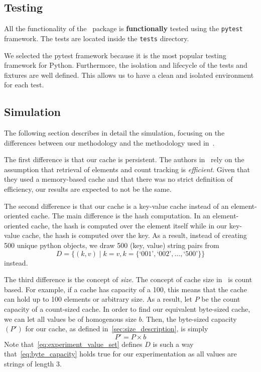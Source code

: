 \subsection{Testing}
All the functionality of the \sqlitecache~package is \textbf{functionally} tested using
the \texttt{pytest} framework. The tests are located inside the \texttt{tests} directory.

We selected the pytest framework because it is the most popular testing framework
for Python. Furthermore, the isolation and lifecycle of the tests and fixtures
are well defined. This allows us to have a clean and isolated environment
for each test.


\subsection{Simulation\label{sec:simulation}}
The following section describes in detail the simulation, focusing on the differences
between our methodology and the methodology used in~\cite{shah2023ImprovedCacheEviction}.

The first difference is that our cache is persistent.
The authors in~\cite{shah2023ImprovedCacheEviction} rely on the assumption
that retrieval of elements and count tracking is \textit{efficient}. Given
that they used a memory-based cache and that there was no strict definition
of efficiency, our results are expected to not be the same.

The second difference is that our cache is a key-value cache instead
of an element-oriented cache. The main difference is the hash computation.
In an element-oriented cache, the hash is computed over the element itself
while in our key-value cache, the hash is computed over the key.
As a result, instead of creating 500 unique python objects,
we draw 500 (key, value) string pairs from
\begin{equation}
D = \{(k, v) \mid k = v, k = \{\text{`001'}, \text{`002'}, \ldots, \text{`500'}\}\}
\label{eq:experiment_value_set}
\end{equation}
instead.

The third difference is the concept of \textit{size}.
The concept of cache size in~\cite{shah2023ImprovedCacheEviction}
is count based. For example, if a cache has capacity of a 100,
this means that the cache can hold up to 100 elements or
arbitrary size. As a result, let $P$ be the count capacity
of a count-sized cache. In order to find our equivalent byte-sized
cache, we can let all values be of homogenous size $b$.
Then, the byte-sized capacity $(P')$ for our cache, as defined
in~\ref{sec:size_description}, is simply
\begin{equation}
    P' = P \times b
    \label{eq:byte_capacity}
\end{equation}
Note that~\autoref{eq:experiment_value_set} defines $D$ is such a way
that~\autoref{eq:byte_capacity} holds true for our experimentation
as all values are strings of length 3.

